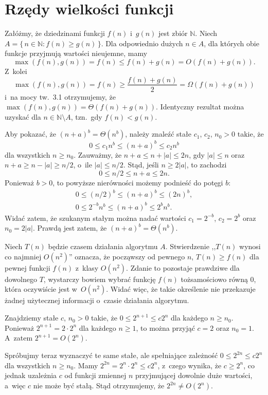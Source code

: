 \chapter{Rzędy wielkości funkcji}


\exercise %
Załóżmy, że dziedzinami funkcji $f(n)$ i~$g(n)$ jest zbiór $\mathbb{N}$.
Niech $A=\{\,n\in\mathbb{N}:f(n)\ge g(n)\,\}$.
Dla odpowiednio dużych $n\in A$, dla których obie funkcje przyjmują wartości nieujemne, mamy
\[
    \max(f(n),g(n)) = f(n) \le f(n)+g(n) = O(f(n)+g(n)).
\]
Z~kolei
\[
    \max(f(n),g(n)) = f(n) \ge \frac{f(n)+g(n)}{2} = \Omega(f(n)+g(n))
\]
i~na mocy tw.\ 3.1 otrzymujemy, że $\max(f(n),g(n))=\Theta(f(n)+g(n))$.
Identyczny rezultat można uzyskać dla $n\in\mathbb{N}\setminus A$, tzn.\ gdy $f(n)<g(n)$.

\exercise %
Aby pokazać, że $(n+a)^b=\Theta(n^b)$, należy znaleźć stałe $c_1$, $c_2$, $n_0>0$ takie, że
\[
	0 \le c_1n^b \le (n+a)^b \le c_2n^b
\]
dla wszystkich $n\ge n_0$.
Zauważmy, że $n+a\le n+|a|\le2n$, gdy $|a|\le n$ oraz $n+a\ge n-|a|\ge n/2$, o~ile $|a|\le n/2$.
Stąd, jeśli $n\ge 2|a|$, to zachodzi
\[
	0 \le n/2 \le n+a \le 2n.
\]
Ponieważ $b>0$, to powyższe nierówności możemy podnieść do potęgi $b$:
\begin{gather*}
	0 \le (n/2)^b \le (n+a)^b \le (2n)^b, \\
	0 \le 2^{-b}n^b \le (n+a)^b \le 2^bn^b.
\end{gather*}
Widać zatem, że szukanym stałym można nadać wartości $c_1=2^{-b}$, $c_2=2^b$ oraz $n_0=2|a|$.
Prawdą jest zatem, że $(n+a)^b=\Theta(n^b)$.

\exercise %
Niech $T(n)$ będzie czasem działania algorytmu $A$.
Stwierdzenie ,,$T(n)$ wynosi co najmniej $O(n^2)$'' oznacza, że począwszy od pewnego $n$, $T(n)\ge f(n)$ dla pewnej funkcji $f(n)$ z~klasy $O(n^2)$.
Zdanie to pozostaje prawdziwe dla dowolnego $T$, wystarczy bowiem wybrać funkcję $f(n)$ tożsamościowo równą 0, która oczywiście jest w~$O(n^2)$.
Widać więc, że takie określenie nie przekazuje żadnej użytecznej informacji o~czasie działania algorytmu.

\exercise %
Znajdziemy stałe $c$, $n_0>0$ takie, że $0\le2^{n+1}\le c2^n$ dla każdego $n\ge n_0$.
Ponieważ $2^{n+1}=2\cdot2^n$ dla każdego $n\ge1$, to można przyjąć $c=2$ oraz $n_0=1$.
A~zatem $2^{n+1}=O(2^n)$.

Spróbujmy teraz wyznaczyć te same stałe, ale spełniające zależność $0\le2^{2n}\le c2^n$ dla wszystkich $n\ge n_0$.
Mamy $2^{2n}=2^n\cdot2^n\le c2^n$, z~czego wynika, że $c\ge2^n$, co jednak uzależnia $c$ od funkcji zmiennej $n$ przyjmującej dowolnie duże wartości, a~więc $c$ nie może być stałą.
Stąd otrzymujemy, że $2^{2n}\ne O(2^n)$.

